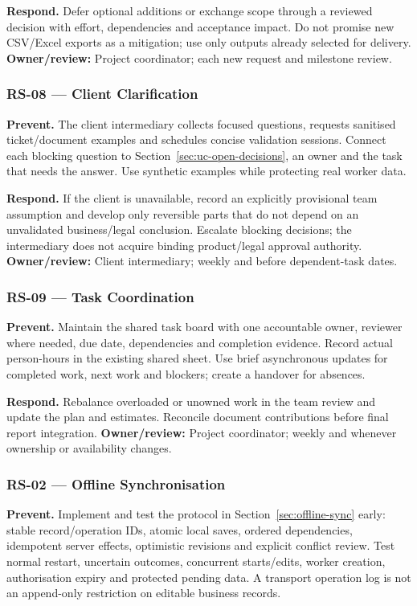 \textbf{Respond.} Defer optional additions or exchange scope through a reviewed
decision with effort, dependencies and acceptance impact. Do not promise new
CSV/Excel exports as a mitigation; use only outputs already selected for delivery.
\textbf{Owner/review:} Project coordinator; each new request and milestone review.

\subsubsection{RS-08 --- Client Clarification}
\textbf{Prevent.} The client intermediary collects focused questions, requests
sanitised ticket/document examples and schedules concise validation sessions.
Connect each blocking question to Section~\ref{sec:uc-open-decisions}, an owner
and the task that needs the answer. Use synthetic examples while protecting real
worker data.

\textbf{Respond.} If the client is unavailable, record an explicitly provisional
team assumption and develop only reversible parts that do not depend on an
unvalidated business/legal conclusion. Escalate blocking decisions; the
intermediary does not acquire binding product/legal approval authority.
\textbf{Owner/review:} Client intermediary; weekly and before dependent-task dates.

\subsubsection{RS-09 --- Task Coordination}
\textbf{Prevent.} Maintain the shared task board with one accountable owner,
reviewer where needed, due date, dependencies and completion evidence. Record
actual person-hours in the existing shared sheet. Use brief asynchronous updates
for completed work, next work and blockers; create a handover for absences.

\textbf{Respond.} Rebalance overloaded or unowned work in the team review and
update the plan and estimates. Reconcile document contributions before final
report integration. \textbf{Owner/review:} Project coordinator; weekly and whenever
ownership or availability changes.

\subsubsection{RS-02 --- Offline Synchronisation}
\textbf{Prevent.} Implement and test the protocol in Section~\ref{sec:offline-sync}
early: stable record/operation IDs, atomic local saves, ordered dependencies,
idempotent server effects, optimistic revisions and explicit conflict review.
Test normal restart, uncertain outcomes, concurrent starts/edits, worker creation,
authorisation expiry and protected pending data. A transport operation log is not
an append-only restriction on editable business records.

